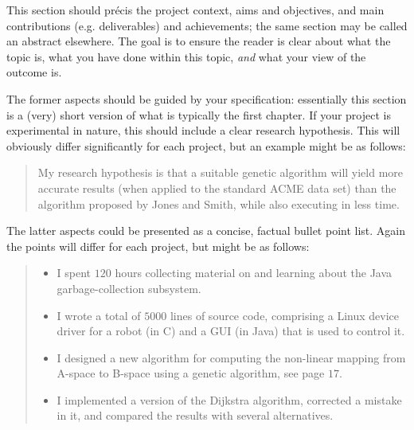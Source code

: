 
This section should pr\'{e}cis the project context, aims and objectives,
and main contributions (e.g. deliverables) and achievements; the same 
section may be called an abstract elsewhere.  The goal is to ensure the 
reader is clear about what the topic is, what you have done within this 
topic, \emph{and} what your view of the outcome is.

The former aspects should be guided by your specification: essentially 
this section is a (very) short version of what is typically the first 
chapter. If your project is experimental in nature, this should include 
a clear research hypothesis.  This will obviously differ significantly
for each project, but an example might be as follows:

\begin{quote}
  My research hypothesis is that a suitable genetic algorithm will yield
  more accurate results (when applied to the standard ACME data set) than 
  the algorithm proposed by Jones and Smith, while also executing in less
  time.
\end{quote}

The latter aspects could be presented as a concise, factual bullet point list.
Again the points will differ for each project, but might be as follows:

\begin{quote}
  \begin{itemize}
  \item I spent $120$ hours collecting material on and learning about the Java
    garbage-collection subsystem. 
  \item I wrote a total of $5000$ lines of source code, comprising a Linux
    device driver for a robot (in C) and a GUI (in Java) that is used to
    control it.
  \item I designed a new algorithm for computing the non-linear mapping from
    A-space to B-space using a genetic algorithm, see page $17$.
  \item I implemented a version of the Dijkstra algorithm, corrected a mistake
    in it, and compared the results with several alternatives.
  \end{itemize}
\end{quote}
